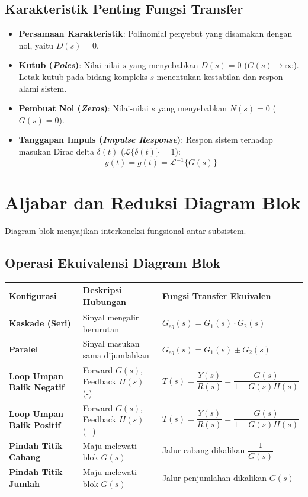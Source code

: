 \documentclass[11pt,a4paper]{article}
\begin{document}
\subsection{Karakteristik Penting Fungsi Transfer}
\begin{itemize}
    \item \textbf{Persamaan Karakteristik}: Polinomial penyebut yang disamakan dengan nol, yaitu $D(s) = 0$.
    \item \textbf{Kutub (\textit{Poles})}: Nilai-nilai $s$ yang menyebabkan $D(s) = 0$ ($G(s) \to \infty$). Letak kutub pada bidang kompleks $s$ menentukan kestabilan dan respon alami sistem.
    \item \textbf{Pembuat Nol (\textit{Zeros})}: Nilai-nilai $s$ yang menyebabkan $N(s) = 0$ ($G(s) = 0$).
    \item \textbf{Tanggapan Impuls (\textit{Impulse Response})}: Respon sistem terhadap masukan Dirac delta $\delta(t)$ ($\mathcal{L}\{\delta(t)\} = 1$):
    \begin{equation*}
        y(t) = g(t) = \mathcal{L}^{-1}\{G(s)\}
    \end{equation*}
\end{itemize}

\vspace{6pt}

\section{Aljabar dan Reduksi Diagram Blok}

Diagram blok menyajikan interkoneksi fungsional antar subsistem.

\subsection{Operasi Ekuivalensi Diagram Blok}
\begin{center}
\small
\begin{tabular}{|p{3.5cm}|p{5cm}|p{6cm}|}
\hline
\textbf{Konfigurasi} & \textbf{Deskripsi Hubungan} & \textbf{Fungsi Transfer Ekuivalen} \\ \hline
\textbf{Kaskade (Seri)} & Sinyal mengalir berurutan & $G_{eq}(s) = G_1(s) \cdot G_2(s)$ \\ \hline
\textbf{Paralel} & Sinyal masukan sama dijumlahkan & $G_{eq}(s) = G_1(s) \pm G_2(s)$ \\ \hline
\textbf{Loop Umpan Balik Negatif} & Forward $G(s)$, Feedback $H(s)$ (-) & $T(s) = \dfrac{Y(s)}{R(s)} = \dfrac{G(s)}{1 + G(s)H(s)}$ \\ \hline
\textbf{Loop Umpan Balik Positif} & Forward $G(s)$, Feedback $H(s)$ (+) & $T(s) = \dfrac{Y(s)}{R(s)} = \dfrac{G(s)}{1 - G(s)H(s)}$ \\ \hline
\textbf{Pindah Titik Cabang} & Maju melewati blok $G(s)$ & Jalur cabang dikalikan $\dfrac{1}{G(s)}$ \\ \hline
\textbf{Pindah Titik Jumlah} & Maju melewati blok $G(s)$ & Jalur penjumlahan dikalikan $G(s)$ \\ \hline
\end{tabular}
\end{center}
\end{document}
